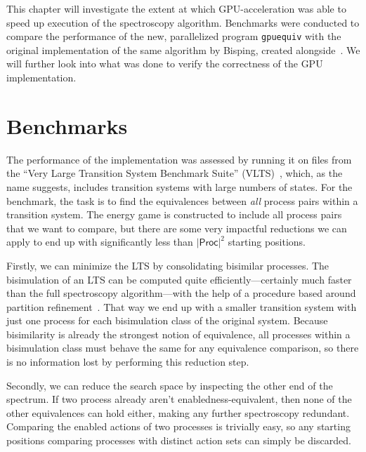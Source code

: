 This chapter will investigate the extent at which GPU-acceleration was able to
speed up execution of the spectroscopy algorithm.
Benchmarks were conducted to compare the performance of the new,
parallelized program \texttt{gpuequiv}
with the original implementation of the same algorithm by Bisping,
created alongside~\cite{bisping2023process}.
We will further look into what was done to verify the correctness of the GPU
implementation.

\section{Benchmarks}

The performance of the implementation was assessed by running it on files from
the \enquote{Very Large Transition System Benchmark Suite} (VLTS)~\cite{vlts},
which, as the name suggests,
includes transition systems with large numbers of states.
For the benchmark, the task is to find the equivalences between \emph{all}
process pairs within a transition system.
The energy game is constructed to include all process pairs that we want to
compare,
but there are some very impactful reductions we can apply to end up with
significantly less than $|\mathsf{Proc}|^2$ starting positions.

Firstly, we can minimize the LTS by consolidating bisimilar processes.
The bisimulation of an LTS can be computed quite efficiently---certainly much
faster than the full spectroscopy algorithm---with the help of a procedure
based around partition refinement~\cite{Blom2002}.
That way we end up with a smaller transition system with just one process for
each bisimulation class of the original system.
Because bisimilarity is already the strongest notion of equivalence,
all processes within a bisimulation class must behave the same for any
equivalence comparison,
so there is no information lost by performing this reduction step.

Secondly,
we can reduce the search space by inspecting the other end of the spectrum.
If two process already aren't enabledness-equivalent,
then none of the other equivalences can hold either,
making any further spectroscopy redundant.
Comparing the enabled actions of two processes is trivially easy,
so any starting positions comparing processes with distinct action sets
can simply be discarded.

